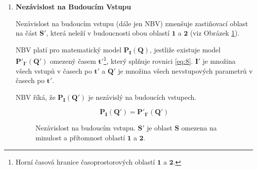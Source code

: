 \begin{enumerate}
    \item \textbf{Nezávislost na Budoucím Vstupu}
     
    Nezávislost na budoucím vstupu (dále jen NBV) zmenšuje zastiňovací oblast na část $\bm{S'}$, která neleží v budoucnosti obou oblastí $\bm{1}$ a $\bm{2}$ (viz Obrázek \ref{fig:8}).

    NBV platí pro matematický model $\bm{P_{I}(Q)}$, jestliže existuje model $\bm{P'_{I'}(Q')}$ omezený časem $\bm{t'}$\footnote[5]{Horní časová hranice časoprostorových oblastí $\bm{1}$ a $\bm{2}$.}, který splňuje rovnici \ref{eq:8}. $\bm{I'}$ je množina všech vstupů v časech po $\bm{t'}$  a $\bm{Q'}$ je množina všech nevstupových parametrů v časech po $\bm{t'}$.

    NBV říká, že $\bm{P_{I}(Q')}$ je nezávislý na budoucích vstupech.

    \begin{equation}
        \bm{P_{I}(Q') = P'_{I'}(Q')}
        \label{eq:8}
    \end{equation}

    \clearpage
    
    \begin{figure}[ht]

        \centering
    
        \caption{\label{fig:8}Nezávislost na budoucím vstupu. $\bm{S'}$ je oblast $\bm{S}$ omezena na minulost a přítomnost oblastí $\bm{1}$ a $\bm{2}$.}
    \end{figure}
    


\end{enumerate}

